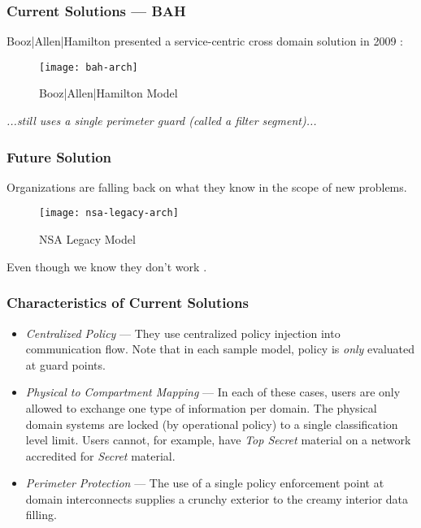 \begin{frame}[t]
\frametitle{Current Solutions --- BAH}
Booz|Allen|Hamilton presented a service-centric cross domain solution in 2009 \cite{proposal:bah-arch}:
\begin{figure}[!t]
\centering
\texttt{[image: bah-arch]}
\caption{Booz|Allen|Hamilton Model}
\label{fig:model:conceptual-model}
\end{figure}
\textit{...still uses a single perimeter guard (called a filter segment)...}
\end{frame}

\begin{frame}[t]
\frametitle{Future Solution}
Organizations are falling back on what they know in the scope of new problems.
\begin{figure}[!t]
\centering
\texttt{[image: nsa-legacy-arch]}
\caption{NSA Legacy Model}
\label{fig:model:conceptual-model}
\end{figure}
Even though we know they don't work \cite{proposal:ron-ross}.
\end{frame}

%
\begin{frame}
\frametitle{Characteristics of Current Solutions}
\begin{itemize}
\item<2-> \textit{Centralized Policy} --- They use centralized policy injection into communication flow.  Note that in each sample model, policy is \textit{only} evaluated at guard points.
\item<3-> \textit{Physical to Compartment Mapping} --- In each of these cases, users are only allowed to exchange one type of information per domain.  The physical domain systems are locked (by operational policy) to a single classification level limit.  Users cannot, for example, have \emph{Top Secret} material on a network accredited for \emph{Secret} material.
\item<4-> \textit{Perimeter Protection} --- The use of a single policy enforcement point at domain interconnects supplies a crunchy exterior to the creamy interior data filling.
\end{itemize}
\end{frame}

